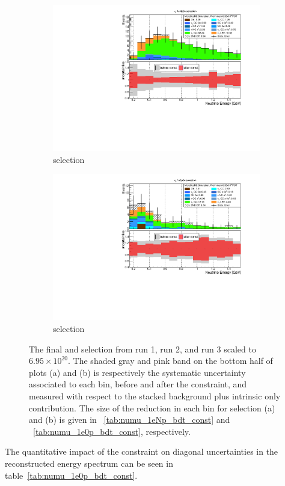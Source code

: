 \begin{center}
\begin{figure}[ht] 
    \begin{subfigure}{0.45\textwidth}
    \centering
    \includegraphics[width=1.00\textwidth]{Sensitivity/newconstraintplots/nue_numu_reco_e_H1_mc_collab_beforeafter_constraint.pdf}
    \caption{\npsel selection}
    \end{subfigure}
    \begin{subfigure}{0.45\textwidth}
    \centering
    \includegraphics[width=1.00\textwidth]{Sensitivity/newconstraintplots/1e0p_numu_reco_e_H1_mc_collab_beforeafter_constraint.pdf}
    \caption{\zpsel selection}
    \end{subfigure}
\caption{\label{fig:numuconstraintzpselnpsel} The final \npsel and \zpsel selection from run 1, run 2, and run 3 scaled to $6.95 \times 10^{20}$. The shaded gray and pink band on the bottom half of plots (a) and (b) is respectively the systematic uncertainty associated to each bin, before and after the \numu constraint, and measured with respect to the stacked background plus intrinsic \nue only contribution. The size of the reduction in each bin for selection (a) and (b) is given in ~\cref{tab:numu_1eNp_bdt_const} and ~\cref{tab:numu_1e0p_bdt_const}, respectively.}
\end{figure}
\end{center}
The quantitative impact of the constraint on diagonal uncertainties in the \zpsel reconstructed energy spectrum can be seen in table~\ref{tab:numu_1e0p_bdt_const}.

